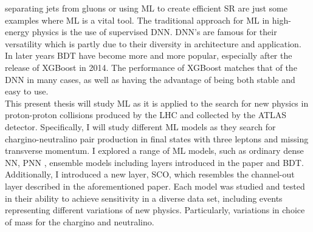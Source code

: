 separating jets from gluons \cite{PhysRevD.44.2025} or using \ac{ML} to create efficient \ac{SR} \cite{baldi_searching_2014} are just some examples
where \ac{ML} is a vital tool. The traditional approach for ML in high-energy physics is the use of supervised
\ac{DNN}. \ac{DNN}'s are famous for their versatility which is partly due to their diversity in architecture and 
application. In later years \ac{BDT} have become more and more popular, especially after the release of XGBoost 
in 2014. The performance of XGBoost matches that of the \ac{DNN} in many cases, as well as having the advantage 
of being both stable and easy to use. \newline
\\
This present thesis will study \ac{ML} as it is applied to the search for new physics in proton-proton collisions produced by the \ac{LHC} and collected by 
the \ac{ATLAS} detector. Specifically, I will study different \ac{ML} models as they search for chargino-neutralino pair production in final states 
with three leptons and missing transverse momentum. I explored a range of \ac{ML} models, such as ordinary dense \acl{NN}, \acl{PNN} \cite{PNN},
ensemble models including layers introduced in the paper \cite{wang_maxout_2013} and \acl{BDT}. Additionally, I introduced a new layer, \acl{SCO}, which 
resembles the channel-out layer described in the aforementioned paper. Each model was studied and tested in their ability to achieve sensitivity in a diverse 
data set, including events representing different variations of new physics. Particularly, variations in choice of mass for the chargino and neutralino.
